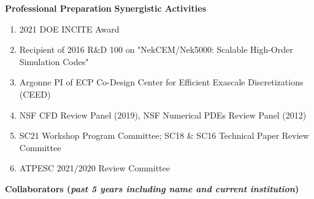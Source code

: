 \documentclass[11pt,letterpaper,english]{article}
\begin{document}
\begin{flushleft} {\bf Professional Preparation}
\vspace{.04in}
{\bf Synergistic Activities}
\vspace{-6pt}
\begin{enumerate} \itemsep1pt \parskip0pt 
\item 2021 DOE INCITE Award
\item Recipient of 2016 R\&D 100 on "NekCEM/Nek5000: Scalable High-Order Simulation Codes"
\item Argonne PI of ECP Co-Design Center for Efficient Exascale Discretizations (CEED)
\item NSF CFD Review Panel (2019), NSF Numerical PDEs Review Panel (2012) 
\item SC21 Workshop Program Committee; SC18 \& SC16 Technical Paper Review Committee  
\item ATPESC 2021/2020 Review Committee
\end{enumerate}

\vspace{-6pt}
{\bf Collaborators ({\emph{past 5 years including name and current institution}})}
{\parindent 16pt

}
\end{flushleft}
\end{document}
